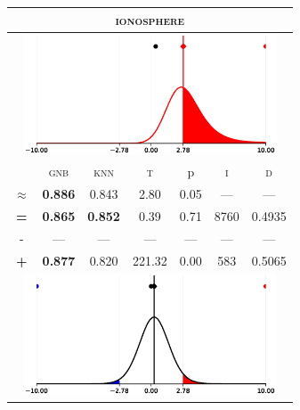 \begin{tabular}{c||cc||c|c|c||c}
	\toprule
	\multicolumn{7}{c}{\textsc{ionosphere}}\\
	\bottomrule
	\multicolumn{7}{c}{\includegraphics[width=7.5cm, trim=30 0 30 0]{figures/ionosphere_0.eps}}\\

\midrule	&\textsc{gnb} & \textsc{knn} & \textsc{t} & p & \textsc{i} & \textsc{d}\\
	\color{red} $\approx$ & \color{red} \bfseries 0.886 &\color{red}   0.843 & 2.80 & 0.05 & --- & ---\\\midrule
	{\bfseries\color{black}\tiny=}& \color{black} \bfseries 0.865 & \color{black} \bfseries 0.852 & 0.39 & 0.71 & 8760 & \color{black} 0.4935\\
	{\tiny-}& --- & --- & --- & --- & --- & ---\\
	{\bfseries\color{red}\tiny+}& \color{red} \bfseries 0.877 & \color{red}  0.820 & 221.32 & 0.00 & 583 & \color{red} 0.5065\\
	\bottomrule
	\multicolumn{7}{c}{\includegraphics[width=7.5cm, trim=30 0 30 0]{figures/ionosphere_1.eps}}\\


\end{tabular}
